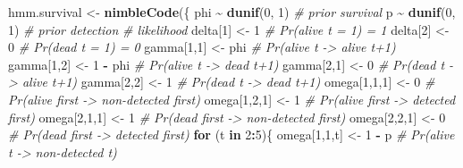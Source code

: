 \documentclass[
  12pt,
]{krantz}
\newenvironment{Shaded}{\begin{snugshade}}{\end{snugshade}}
\newcommand{\CommentTok}[1]{\textcolor[rgb]{0.56,0.35,0.01}{\textit{#1}}}
\newcommand{\ControlFlowTok}[1]{\textcolor[rgb]{0.13,0.29,0.53}{\textbf{#1}}}
\newcommand{\DecValTok}[1]{\textcolor[rgb]{0.00,0.00,0.81}{#1}}
\newcommand{\FunctionTok}[1]{\textcolor[rgb]{0.13,0.29,0.53}{\textbf{#1}}}
\newcommand{\NormalTok}[1]{#1}
\newcommand{\OtherTok}[1]{\textcolor[rgb]{0.56,0.35,0.01}{#1}}
\newcommand{\SpecialCharTok}[1]{\textcolor[rgb]{0.81,0.36,0.00}{\textbf{#1}}}
\begin{document}
\begin{Shaded}
\begin{Highlighting}[]
\NormalTok{hmm.survival }\OtherTok{\textless{}{-}} \FunctionTok{nimbleCode}\NormalTok{(\{}
\NormalTok{  phi }\SpecialCharTok{\textasciitilde{}} \FunctionTok{dunif}\NormalTok{(}\DecValTok{0}\NormalTok{, }\DecValTok{1}\NormalTok{) }\CommentTok{\# prior survival}
\NormalTok{  p }\SpecialCharTok{\textasciitilde{}} \FunctionTok{dunif}\NormalTok{(}\DecValTok{0}\NormalTok{, }\DecValTok{1}\NormalTok{) }\CommentTok{\# prior detection}
  \CommentTok{\# likelihood}
\NormalTok{  delta[}\DecValTok{1}\NormalTok{] }\OtherTok{\textless{}{-}} \DecValTok{1}          \CommentTok{\# Pr(alive t = 1) = 1}
\NormalTok{  delta[}\DecValTok{2}\NormalTok{] }\OtherTok{\textless{}{-}} \DecValTok{0}          \CommentTok{\# Pr(dead t = 1) = 0}
\NormalTok{  gamma[}\DecValTok{1}\NormalTok{,}\DecValTok{1}\NormalTok{] }\OtherTok{\textless{}{-}}\NormalTok{ phi      }\CommentTok{\# Pr(alive t {-}\textgreater{} alive t+1)}
\NormalTok{  gamma[}\DecValTok{1}\NormalTok{,}\DecValTok{2}\NormalTok{] }\OtherTok{\textless{}{-}} \DecValTok{1} \SpecialCharTok{{-}}\NormalTok{ phi  }\CommentTok{\# Pr(alive t {-}\textgreater{} dead t+1)}
\NormalTok{  gamma[}\DecValTok{2}\NormalTok{,}\DecValTok{1}\NormalTok{] }\OtherTok{\textless{}{-}} \DecValTok{0}        \CommentTok{\# Pr(dead t {-}\textgreater{} alive t+1)}
\NormalTok{  gamma[}\DecValTok{2}\NormalTok{,}\DecValTok{2}\NormalTok{] }\OtherTok{\textless{}{-}} \DecValTok{1}        \CommentTok{\# Pr(dead t {-}\textgreater{} dead t+1)}
\NormalTok{  omega[}\DecValTok{1}\NormalTok{,}\DecValTok{1}\NormalTok{,}\DecValTok{1}\NormalTok{] }\OtherTok{\textless{}{-}} \DecValTok{0}        \CommentTok{\# Pr(alive first {-}\textgreater{} non{-}detected first)}
\NormalTok{  omega[}\DecValTok{1}\NormalTok{,}\DecValTok{2}\NormalTok{,}\DecValTok{1}\NormalTok{] }\OtherTok{\textless{}{-}} \DecValTok{1}        \CommentTok{\# Pr(alive first {-}\textgreater{} detected first)}
\NormalTok{  omega[}\DecValTok{2}\NormalTok{,}\DecValTok{1}\NormalTok{,}\DecValTok{1}\NormalTok{] }\OtherTok{\textless{}{-}} \DecValTok{1}        \CommentTok{\# Pr(dead first {-}\textgreater{} non{-}detected first)}
\NormalTok{  omega[}\DecValTok{2}\NormalTok{,}\DecValTok{2}\NormalTok{,}\DecValTok{1}\NormalTok{] }\OtherTok{\textless{}{-}} \DecValTok{0}        \CommentTok{\# Pr(dead first {-}\textgreater{} detected first)}
  \ControlFlowTok{for}\NormalTok{ (t }\ControlFlowTok{in} \DecValTok{2}\SpecialCharTok{:}\DecValTok{5}\NormalTok{)\{}
\NormalTok{    omega[}\DecValTok{1}\NormalTok{,}\DecValTok{1}\NormalTok{,t] }\OtherTok{\textless{}{-}} \DecValTok{1} \SpecialCharTok{{-}}\NormalTok{ p    }\CommentTok{\# Pr(alive t {-}\textgreater{} non{-}detected t)}

\end{Highlighting}
\end{Shaded}
\end{document}
